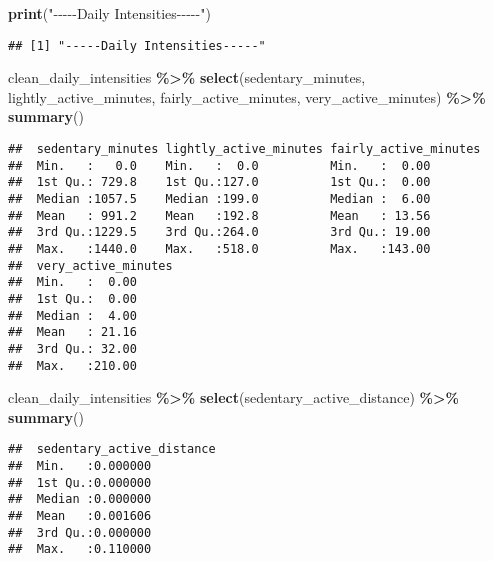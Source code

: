\documentclass[
]{article}
\newenvironment{Shaded}{\begin{snugshade}}{\end{snugshade}}
\newcommand{\FunctionTok}[1]{\textcolor[rgb]{0.13,0.29,0.53}{\textbf{#1}}}
\newcommand{\NormalTok}[1]{#1}
\newcommand{\SpecialCharTok}[1]{\textcolor[rgb]{0.81,0.36,0.00}{\textbf{#1}}}
\newcommand{\StringTok}[1]{\textcolor[rgb]{0.31,0.60,0.02}{#1}}
\begin{document}
\begin{Shaded}
\begin{Highlighting}[]
\FunctionTok{print}\NormalTok{(}\StringTok{"{-}{-}{-}{-}{-}Daily Intensities{-}{-}{-}{-}{-}"}\NormalTok{)}
\end{Highlighting}
\end{Shaded}

\begin{verbatim}
## [1] "-----Daily Intensities-----"
\end{verbatim}

\begin{Shaded}
\begin{Highlighting}[]
\NormalTok{clean\_daily\_intensities }\SpecialCharTok{\%\textgreater{}\%} 
  \FunctionTok{select}\NormalTok{(sedentary\_minutes, lightly\_active\_minutes, fairly\_active\_minutes, very\_active\_minutes) }\SpecialCharTok{\%\textgreater{}\%} 
  \FunctionTok{summary}\NormalTok{()}
\end{Highlighting}
\end{Shaded}

\begin{verbatim}
##  sedentary_minutes lightly_active_minutes fairly_active_minutes
##  Min.   :   0.0    Min.   :  0.0          Min.   :  0.00       
##  1st Qu.: 729.8    1st Qu.:127.0          1st Qu.:  0.00       
##  Median :1057.5    Median :199.0          Median :  6.00       
##  Mean   : 991.2    Mean   :192.8          Mean   : 13.56       
##  3rd Qu.:1229.5    3rd Qu.:264.0          3rd Qu.: 19.00       
##  Max.   :1440.0    Max.   :518.0          Max.   :143.00       
##  very_active_minutes
##  Min.   :  0.00     
##  1st Qu.:  0.00     
##  Median :  4.00     
##  Mean   : 21.16     
##  3rd Qu.: 32.00     
##  Max.   :210.00
\end{verbatim}

\begin{Shaded}
\begin{Highlighting}[]
\NormalTok{clean\_daily\_intensities }\SpecialCharTok{\%\textgreater{}\%} 
  \FunctionTok{select}\NormalTok{(sedentary\_active\_distance) }\SpecialCharTok{\%\textgreater{}\%} 
  \FunctionTok{summary}\NormalTok{()}
\end{Highlighting}
\end{Shaded}

\begin{verbatim}
##  sedentary_active_distance
##  Min.   :0.000000         
##  1st Qu.:0.000000         
##  Median :0.000000         
##  Mean   :0.001606         
##  3rd Qu.:0.000000         
##  Max.   :0.110000
\end{verbatim}
\end{document}
